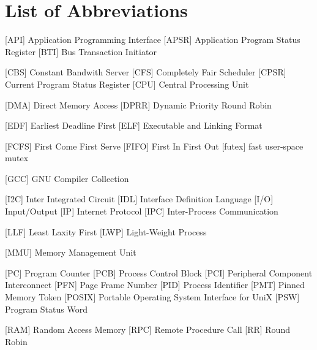 
\chapter*{List of Abbreviations}

\begin{acronym} [POSIX]
 [API] {Application Programming Interface}
 [APSR] {Application Program Status Register}
 [BTI] {Bus Transaction Initiator}

 [CBS] {Constant Bandwith Server}
 [CFS] {Completely Fair Scheduler}
 [CPSR] {Current Program Status Register}
 [CPU] {Central Processing Unit}

 [DMA] {Direct Memory Access}
 [DPRR] {Dynamic Priority Round Robin}

 [EDF] {Earliest Deadline First}
 [ELF] {Executable and Linking Format}

 [FCFS] {First Come First Serve}
 [FIFO] {First In First Out}
 [futex] {fast user-space mutex}

 [GCC] {GNU Compiler Collection}


 [I2C] {Inter Integrated Circuit}
 [IDL] {Interface Definition Language}
 [I/O] {Input/Output}
 [IP] {Internet Protocol}
[IPC] {Inter-Process Communication}



 [LLF] {Least Laxity First}
 [LWP] {Light-Weight Process}

 [MMU] {Memory Management Unit}



 [PC] {Program Counter}
 [PCB] {Process Control Block}
 [PCI] {Peripheral Component Interconnect}
 [PFN] {Page Frame Number}
 [PID] {Process Identifier}
 [PMT] {Pinned Memory Token}
 [POSIX] {Portable Operating System Interface for UniX}
 [PSW] {Program Status Word}


  [RAM] {Random Access Memory}
 [RPC] {Remote Procedure Call}
 [RR] {Round Robin}


\end{acronym}
